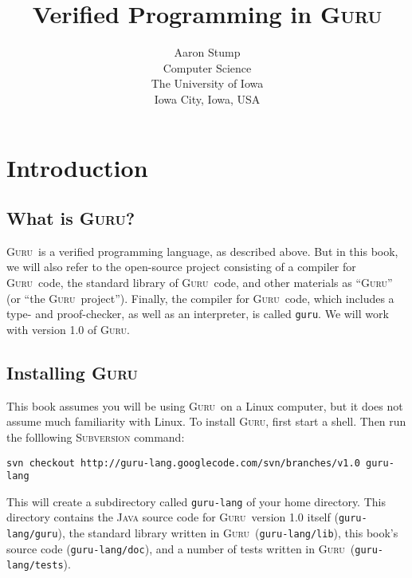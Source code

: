 \documentclass{book}[12pt]
\newcommand{\guru}[0]{\textsc{Guru}}
\begin{document}
\title{Verified Programming in \guru}

\author{Aaron Stump \\
Computer Science \\
The University of Iowa \\
Iowa City, Iowa, USA
}

\maketitle

\tableofcontents

\chapter{Introduction}
\label{ch1}

\section{What is \guru?}

\guru\ is a verified programming language, as described above.  But in
this book, we will also refer to the open-source project consisting of
a compiler for \guru\ code, the standard library of \guru\ code, and
other materials as ``\guru'' (or ``the \guru\ project'').  Finally,
the compiler for \guru\ code, which includes a type- and
proof-checker, as well as an interpreter, is called \texttt{guru}.  We
will work with version 1.0 of \guru.

\section{Installing \guru}

This book assumes you will be using \guru\ on a Linux computer, but it
does not assume much familiarity with Linux.  To install \guru, first
start a shell. Then run the folllowing \textsc{Subversion} command:

\begin{verbatim}
svn checkout http://guru-lang.googlecode.com/svn/branches/v1.0 guru-lang
\end{verbatim}

\noindent This will create a subdirectory called \texttt{guru-lang} of
your home directory.  This directory contains the \textsc{Java} source
code for \guru\ version 1.0 itself (\texttt{guru-lang/guru}), the
standard library written in \guru\ (\texttt{guru-lang/lib}), this
book's source code (\texttt{guru-lang/doc}), and a number of tests
written in \guru\ (\texttt{guru-lang/tests}).
\end{document}
